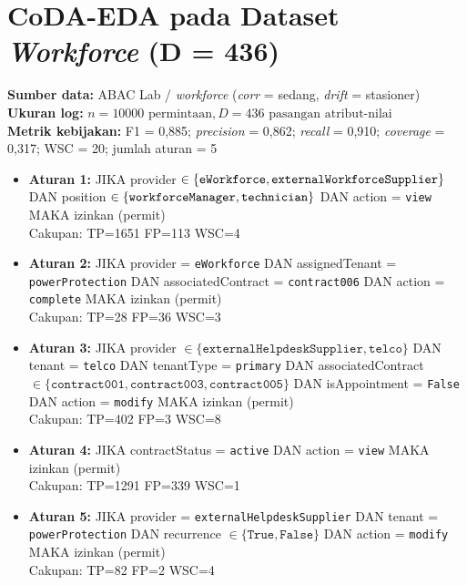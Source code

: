 \section{CoDA-EDA pada Dataset \textit{Workforce} (D = 436)}

\textbf{Sumber data:} ABAC Lab / \textit{workforce} (\textit{corr} = sedang, \textit{drift} = stasioner) \\
\textbf{Ukuran log:} $n = 10000 \text{ permintaan}, D = 436 \text{ pasangan atribut-nilai}$ \\
\textbf{Metrik kebijakan:} F1 = 0,885; \textit{precision} = 0,862; \textit{recall} = 0,910; \textit{coverage} = 0,317; WSC = 20; jumlah aturan = 5 \\

\begin{itemize}
    \item \textbf{Aturan 1:} JIKA \textsf{provider} $\in \{\texttt{eWorkforce},\\ \texttt{externalWorkforceSupplier}\}$ DAN \textsf{position} $\in \\\{\texttt{workforceManager}, \texttt{technician}\}$ DAN \textsf{action} = \texttt{view} MAKA izinkan (permit) \\
    \hspace*{1cm} Cakupan: TP=1651  FP=113  WSC=4

    \item \textbf{Aturan 2:} JIKA \textsf{provider} = \texttt{eWorkforce} DAN \textsf{assignedTenant} = \texttt{powerProtection} DAN \textsf{associatedContract} = \texttt{contract006} DAN \textsf{action} = \texttt{complete} MAKA izinkan (permit) \\
    \hspace*{1cm} Cakupan: TP=28  FP=36  WSC=3

    \item \textbf{Aturan 3:} JIKA \textsf{provider} $\in \{\texttt{externalHelpdeskSupplier}, \texttt{telco}\}$ DAN \textsf{tenant} = \texttt{telco} DAN \textsf{tenantType} = \texttt{primary} DAN \textsf{associatedContract} $\in \{\texttt{contract001}, \texttt{contract003}, \texttt{contract005}\}$ DAN \textsf{isAppointment} = \texttt{False} DAN \textsf{action} = \texttt{modify} MAKA izinkan (permit) \\
    \hspace*{1cm} Cakupan: TP=402  FP=3  WSC=8

    \item \textbf{Aturan 4:} JIKA \textsf{contractStatus} = \texttt{active} DAN \textsf{action} = \texttt{view} MAKA izinkan (permit) \\
    \hspace*{1cm} Cakupan: TP=1291  FP=339  WSC=1

    \item \textbf{Aturan 5:} JIKA \textsf{provider} = \texttt{externalHelpdeskSupplier} DAN \textsf{tenant} = \texttt{powerProtection} DAN \textsf{recurrence} $\in \{\texttt{True}, \texttt{False}\}$ DAN \textsf{action} = \texttt{modify} MAKA izinkan (permit) \\
    \hspace*{1cm} Cakupan: TP=82  FP=2  WSC=4
\end{itemize}